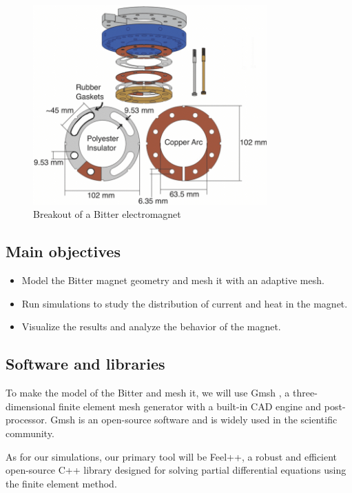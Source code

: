 \documentclass[12pt]{article}
\begin{document}
\begin{figure}[H]
	\centering
	\includegraphics[width=0.8\textwidth]{images/Bitter-electromagnet-breakout.png}
	\caption{Breakout of a Bitter electromagnet \cite{bitter_breakout}}
\end{figure}

\subsection{Main objectives}

\begin{itemize}
	\item Model the Bitter magnet geometry and mesh it with an adaptive mesh.
	\item Run simulations to study the distribution of current and heat in the magnet.
	\item Visualize the results and analyze the behavior of the magnet.
\end{itemize}

\subsection{Software and libraries}
To make the model of the Bitter and mesh it, we will use Gmsh \cite{geuzaine_gmsh_2009}, a three-dimensional
 finite element mesh generator with a built-in CAD engine and post-processor. 
Gmsh is an open-source software and is widely used in the scientific
community.

As for our simulations, our primary tool will be Feel++\cite{christophe_prudhomme_feelppfeelpp_2024}, a robust and 
efficient open-source C++ library designed for solving partial differential equations using 
the finite element method\cite{fem}.
\end{document}
